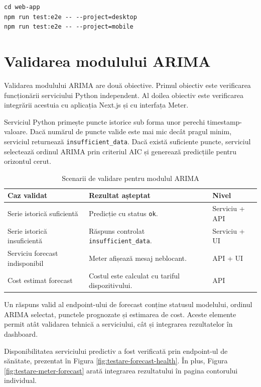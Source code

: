 \begin{verbatim}
cd web-app
npm run test:e2e -- --project=desktop
npm run test:e2e -- --project=mobile
\end{verbatim}

\section{Validarea modulului ARIMA}

Validarea modulului ARIMA are două obiective. Primul obiectiv este verificarea funcționării serviciului Python independent. Al doilea obiectiv este verificarea integrării acestuia cu aplicația Next.js și cu interfața Meter.

Serviciul Python primește puncte istorice sub forma unor perechi timestamp-valoare. Dacă numărul de puncte valide este mai mic decât pragul minim, serviciul returnează \texttt{insufficient\_data}. Dacă există suficiente puncte, serviciul selectează ordinul ARIMA prin criteriul AIC și generează predicțiile pentru orizontul cerut.

\begin{table}[htbp]
\centering
\small
\begin{tabular}{|p{}|p{}|p{}|}
\hline
\textbf{Caz validat} & \textbf{Rezultat așteptat} & \textbf{Nivel} \\
\hline
Serie istorică suficientă & Predicție cu status \texttt{ok}. & Serviciu + API \\
\hline
Serie istorică insuficientă & Răspuns controlat \texttt{insufficient\_data}. & Serviciu + UI \\
\hline
Serviciu forecast indisponibil & Meter afișează mesaj neblocant. & API + UI \\
\hline
Cost estimat forecast & Costul este calculat cu tariful dispozitivului. & API \\
\hline
\end{tabular}
\caption{Scenarii de validare pentru modulul ARIMA}
\label{tab:validare-arima}
\end{table}

Un răspuns valid al endpoint-ului de forecast conține statusul modelului, ordinul ARIMA selectat, punctele prognozate și estimarea de cost. Aceste elemente permit atât validarea tehnică a serviciului, cât și integrarea rezultatelor în dashboard.

Disponibilitatea serviciului predictiv a fost verificată prin endpoint-ul de sănătate, prezentat în Figura \ref{fig:testare-forecast-health}. În plus, Figura \ref{fig:testare-meter-forecast} arată integrarea rezultatului în pagina contorului individual.

